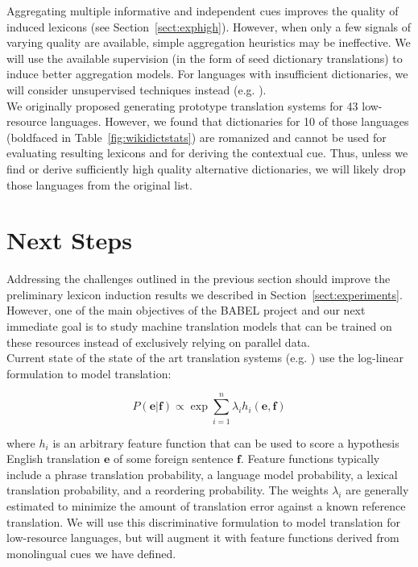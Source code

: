 \documentclass{article}
\newcommand{\secref}[1]{Section~\ref{#1}}
\newcommand{\tabref}[1]{Table~\ref{#1}}
\begin{document}
Aggregating multiple informative and independent cues improves the quality of induced lexicons (see \secref{sect:exphigh}).  However, when only a few signals of varying quality are available, simple aggregation heuristics may be ineffective.  We will use the available supervision (in the form of seed dictionary translations) to induce better aggregation models.  For languages with insufficient dictionaries, we will consider unsupervised techniques instead (e.g. \cite{Klementiev:2006b, Klementiev:2008a}).\\

We originally proposed generating prototype translation systems for 43 low-resource languages. However, we found that dictionaries for 10 of those languages (boldfaced in \tabref{fig:wikidictstats}) are romanized and cannot be used for evaluating resulting lexicons and for deriving the contextual cue.  Thus, unless we find or derive sufficiently high quality alternative dictionaries, we will likely drop those languages from the original list.

\section{Next Steps}

Addressing the challenges outlined in the previous section should improve the preliminary lexicon induction results we described in \secref{sect:experiments}.  However, one of the main objectives of the BABEL project and our next immediate goal is to study machine translation models that can be trained on these resources instead of exclusively relying on parallel data. \\

Current state of the state of the art translation systems (e.g. \cite{Chiang:2005}) use the log-linear formulation  \cite{Och:2002} to model translation:

\begin{equation*}
P(\mathbf{e} | \mathbf{f}) \propto \exp \sum_{i=1}^{n}{\lambda_i h_i (\mathbf{e}, \mathbf{f})} \label{log-linear-formulation}
\end{equation*}

\noindent where  $h_i$ is an arbitrary feature function that can be used to score a hypothesis English translation $\mathbf{e}$ of some foreign sentence $\mathbf{f}$.  Feature functions typically include a phrase translation probability, a language model probability, a lexical translation probability, and a reordering probability.  The weights $\lambda_i$ are generally estimated to minimize the amount of translation error against a known reference translation.  We will use this discriminative formulation to model translation for low-resource languages, but will augment it with feature functions derived from monolingual cues we have defined.  \\
\end{document}
